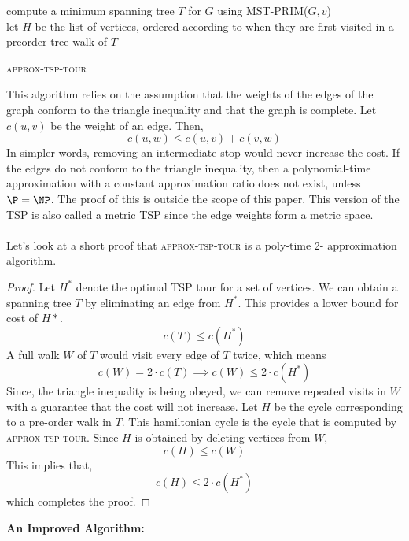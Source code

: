 \documentclass[11pt]{article}
\begin{document}
    \begin{algorithm*}
      compute a minimum spanning tree $T$ for $G$ using \textsc{MST-PRIM}($G, v$) \\
      let $H$ be the list of vertices, ordered according to when they are first visited in a
      preorder tree walk of $T$ \\
  \caption{\textsc{approx-tsp-tour}}
  \end{algorithm*}
    
  This algorithm relies on the assumption that the weights of the edges of the graph conform to the triangle inequality and that the graph is complete.
  Let $c(u,v)$ be the weight of 
  an edge. Then, \[c(u,w) \leq c(u,v) + c(v, w) \]
  In simpler words, removing an intermediate stop would never increase the cost. If the edges do not conform to the triangle inequality, then a polynomial-time approximation
  with a constant approximation ratio does not exist, unless $\P = \NP$. The proof of this
  is outside the scope of this paper. This version of the TSP is also called a metric TSP since 
  the edge weights form a metric space.   
  \paragraph{} Let's look at a short proof that \textsc{approx-tsp-tour} is a poly-time 2- approximation algorithm. 
  \begin{proof}
    Let $H^*$ denote the optimal TSP tour for a set of vertices. We can obtain a spanning tree $T$ by eliminating an edge from 
    $H^*$. This provides a lower bound for cost of $H*$. 
    \[c(T) \leq c(H^*)\] A full walk $W$ of $T$ would visit every edge of $T$ twice, which means   
    \[c(W) = 2\cdot c(T) \implies c(W) \leq 2\cdot c(H^*)\]
  Since, the triangle inequality is being obeyed, we can remove repeated visits in $W$ with a guarantee that 
  the cost will not increase.
  Let $H$ be the cycle corresponding to a pre-order walk in $T$. This hamiltonian cycle is the cycle that is computed by 
  \textsc{approx-tsp-tour}. Since $H$ is obtained by deleting vertices from $W$,
  \[c(H) \leq c(W)\]
  This implies that, \[c(H) \leq 2\cdot c(H^*)\] which completes the proof. 
  \end{proof}

  {\large{\textbf{An Improved Algorithm:}}}  \paragraph{}
  
\end{document}
